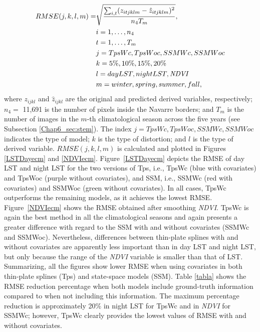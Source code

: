 \begin{align}
RMSE(j,k,l,m)=&\sqrt{\dfrac{\sum_{i,t}(z_{itjklm}-\hat{z}_{itjklm})^2}{n_4T_m}}, \\
& i=1,\ldots,n_4 \nonumber\\  
& t=1,\ldots,T_m \nonumber\\ 
& j=TpsWc, TpsWoc,SSMWc,SSMWoc \nonumber\\ 
& k= 5\%, 10\%, 15\%, 20\% \nonumber\\  
& l=day LST, night LST, \emph{NDVI} \nonumber\\ 
& m=winter, spring, summer, fall, \nonumber
\end{align}
where $z_{ijkl}$ and $\hat{z}_{ijkl}$ are the original and predicted derived variables, respectively; $n_4=$ 11,691 is the number of pixels inside the Navarre borders; and $T_m$ is the number of images in the $m$-th climatological season across the five years (see Subsection \ref{Chap6_sec:stem}).
 The index $j=TpsWc, TpsWoc,SSMWc,SSMWoc$ %
 indicates the type of model; $k$ is the type of distortion; and $l$ is the type of derived variable.
 $RMSE(j,k,l,m)$ is calculated and plotted in Figures \ref{LSTDayecm} and \ref{NDVIecm}.
 Figure~\ref{LSTDayecm} depicts the RMSE of day LST and night LST for the two versions of Tps, i.e., TpsWc (blue with covariates) and TpsWoc (purple without covariates), and SSM, i.e., SSMWc (red with covariates) and SSMWoc (green without covariates). In all cases, TpsWc outperforms the remaining models, as it achieves the lowest RMSE.
Figure~\ref{NDVIecm} shows the RMSE obtained after smoothing \emph{NDVI}. TpsWc is again the best method in all the climatological seasons and again presents a greater difference with regard to the SSM with and without covariates (SSMWc and SSMWoc). Nevertheless, differences between
thin-plate splines with and without covariates are apparently less important than in day LST and night LST, but only because the range of the \emph{NDVI} variable is smaller than that of LST.
Summarizing, all the figures show lower RMSE when using covariates in both thin-plate splines (Tps) and state-space models (SSM).
Table \ref{tabla} shows the RMSE reduction percentage
when both models include ground-truth information compared to when not including this information. The maximum percentage reduction is approximately 20\% in night LST for TpsWc and in \emph{NDVI} for SSMWc; however,
TpsWc clearly provides the lowest values of RMSE with and without covariates.


